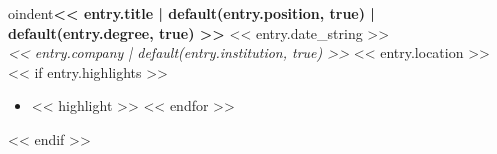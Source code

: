 
oindent\textbf{<< entry.title | default(entry.position, true) | default(entry.degree, true) >>} \hfill << entry.date_string >> \\
\textit{<< entry.company | default(entry.institution, true) >>} \hfill << entry.location >>
<< if entry.highlights >>
\begin{itemize}
    << for highlight in entry.highlights >>
    \item << highlight >>
    << endfor >>
\end{itemize}
<< endif >>
\vspace{0.5em}
